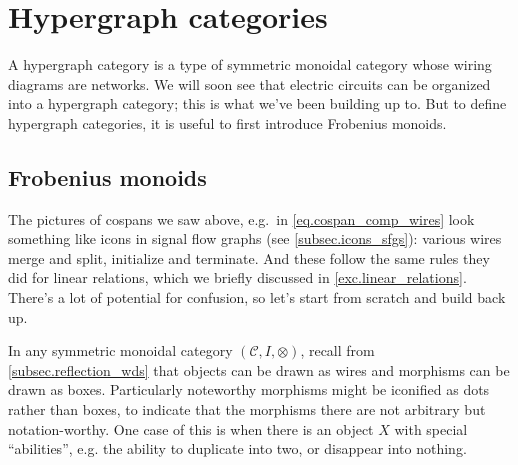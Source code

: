 \documentclass[7Sketches]{subfiles}
\begin{document}
%

\section{Hypergraph categories}%
A hypergraph category is a type of symmetric monoidal category whose wiring
diagrams are networks. We will soon see that electric circuits can be organized into a hypergraph category; this is what we've been building up to. But to define hypergraph categories, it is useful to first introduce Frobenius monoids.

\subsection{Frobenius monoids} %
\label{sec.escfm}%
The pictures of cospans we saw above, e.g.\ in \cref{eq.cospan_comp_wires} look
something like icons in signal flow graphs (see \cref{subsec.icons_sfgs}):
various wires merge and split, initialize and terminate. And these follow the
same rules they did for linear relations, which we briefly discussed in
\cref{exc.linear_relations}. There's a lot of potential for confusion, so let's start
from scratch and build back up.%
%

In any symmetric monoidal category $(\mathcal C,I,\otimes)$, recall from \cref{subsec.reflection_wds} that objects can be drawn as wires and morphisms can be drawn as boxes. Particularly noteworthy morphisms might be iconified as dots rather than boxes, to indicate that the morphisms there are not arbitrary but notation-worthy. One case of this is when there is an object $X$ with special ``abilities'', e.g. the ability to duplicate into two, or disappear into nothing. 
\end{document}
